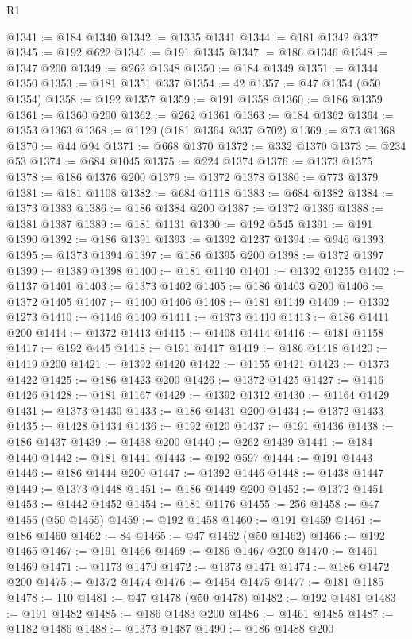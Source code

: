 \begin{lexlean}{R1}
\begin{coremodule}
@1341 := @184 @1340
@1342 := @1335 @1341
@1344 := @181 @1342 @337
@1345 := @192 @622
@1346 := @191 @1345
@1347 := @186 @1346
@1348 := @1347 @200
@1349 := @262 @1348
@1350 := @184 @1349
@1351 := @1344 @1350
@1353 := @181 @1351 @337
@1354 := 42
@1357 := @47 @1354 (@50 @1354)
@1358 := @192 @1357
@1359 := @191 @1358
@1360 := @186 @1359
@1361 := @1360 @200
@1362 := @262 @1361
@1363 := @184 @1362
@1364 := @1353 @1363
@1368 := @1129 (@181 @1364 @337 @702)
@1369 := @73 @1368
@1370 := @44 @94
@1371 := @668 @1370
@1372 := @332 @1370
@1373 := @234 @53
@1374 := @684 @1045
@1375 := @224 @1374
@1376 := @1373 @1375
@1378 := @186 @1376 @200
@1379 := @1372 @1378
@1380 := @773 @1379
@1381 := @181 @1108
@1382 := @684 @1118
@1383 := @684 @1382
@1384 := @1373 @1383
@1386 := @186 @1384 @200
@1387 := @1372 @1386
@1388 := @1381 @1387
@1389 := @181 @1131
@1390 := @192 @545
@1391 := @191 @1390
@1392 := @186 @1391
@1393 := @1392 @1237
@1394 := @946 @1393
@1395 := @1373 @1394
@1397 := @186 @1395 @200
@1398 := @1372 @1397
@1399 := @1389 @1398
@1400 := @181 @1140
@1401 := @1392 @1255
@1402 := @1137 @1401
@1403 := @1373 @1402
@1405 := @186 @1403 @200
@1406 := @1372 @1405
@1407 := @1400 @1406
@1408 := @181 @1149
@1409 := @1392 @1273
@1410 := @1146 @1409
@1411 := @1373 @1410
@1413 := @186 @1411 @200
@1414 := @1372 @1413
@1415 := @1408 @1414
@1416 := @181 @1158
@1417 := @192 @445
@1418 := @191 @1417
@1419 := @186 @1418
@1420 := @1419 @200
@1421 := @1392 @1420
@1422 := @1155 @1421
@1423 := @1373 @1422
@1425 := @186 @1423 @200
@1426 := @1372 @1425
@1427 := @1416 @1426
@1428 := @181 @1167
@1429 := @1392 @1312
@1430 := @1164 @1429
@1431 := @1373 @1430
@1433 := @186 @1431 @200
@1434 := @1372 @1433
@1435 := @1428 @1434
@1436 := @192 @120
@1437 := @191 @1436
@1438 := @186 @1437
@1439 := @1438 @200
@1440 := @262 @1439
@1441 := @184 @1440
@1442 := @181 @1441
@1443 := @192 @597
@1444 := @191 @1443
@1446 := @186 @1444 @200
@1447 := @1392 @1446
@1448 := @1438 @1447
@1449 := @1373 @1448
@1451 := @186 @1449 @200
@1452 := @1372 @1451
@1453 := @1442 @1452
@1454 := @181 @1176
@1455 := 256
@1458 := @47 @1455 (@50 @1455)
@1459 := @192 @1458
@1460 := @191 @1459
@1461 := @186 @1460
@1462 := 84
@1465 := @47 @1462 (@50 @1462)
@1466 := @192 @1465
@1467 := @191 @1466
@1469 := @186 @1467 @200
@1470 := @1461 @1469
@1471 := @1173 @1470
@1472 := @1373 @1471
@1474 := @186 @1472 @200
@1475 := @1372 @1474
@1476 := @1454 @1475
@1477 := @181 @1185
@1478 := 110
@1481 := @47 @1478 (@50 @1478)
@1482 := @192 @1481
@1483 := @191 @1482
@1485 := @186 @1483 @200
@1486 := @1461 @1485
@1487 := @1182 @1486
@1488 := @1373 @1487
@1490 := @186 @1488 @200

\end{coremodule}
\end{lexlean}

